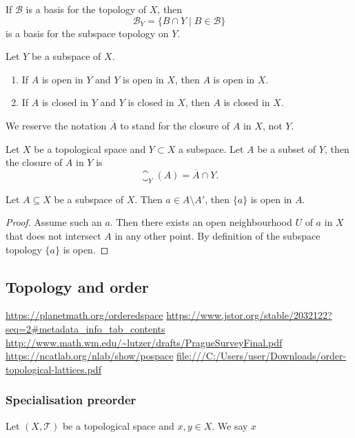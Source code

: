 \begin{lemma}
If $\mathcal{B}$ is a basis for the topology of $X$, then
\[\mathcal{B}_Y = \{ B\cap Y \;|\; B\in \mathcal{B} \}\]
is a basis for the subspace topology on $Y$.
\end{lemma}

\begin{lemma}
Let $Y$ be a subspace of $X$.
\begin{enumerate}
\item If $A$ is open in $Y$ and $Y$ is open in $X$, then $A$ is open in $X$.
\item If $A$ is closed in $Y$ and $Y$ is closed in $X$, then $A$ is closed in $X$.
\end{enumerate}
\end{lemma}
 
We reserve the notation $\overline{A}$ to stand for the closure of $A$ in $X$, not $Y$.
\begin{lemma} \label{subspaceClosure}
Let $X$ be a topological space and $Y\subset X$ a subspace. Let $A$ be a subset of $Y$, then the closure of $A$ in $Y$ is
\[ \closure_Y(A) = \overline{A}\cap Y.  \]
\end{lemma}

\begin{lemma} \label{notLimitPointSingletonOpen}
Let $A\subseteq X$ be a subspace of $X$. Then $a\in A\setminus A'$, then $\{a\}$ is open in $A$.
\end{lemma}
\begin{proof}
Assume such an $a$. Then there exists an open neighbourhood $U$ of $a$ in $X$ that does not intersect $A$ in any other point. By definition of the subspace topology $\{a\}$ is open.
\end{proof}

\subsection{Topology and order}


\url{https://planetmath.org/orderedspace}
\url{https://www.jstor.org/stable/2032122?seq=2#metadata_info_tab_contents}
\url{http://www.math.wm.edu/~lutzer/drafts/PragueSurveyFinal.pdf}
\url{https://ncatlab.org/nlab/show/pospace}
\url{file:///C:/Users/user/Downloads/order-topological-lattices.pdf}

\subsubsection{Specialisation preorder}
\begin{definition}
Let $(X,\mathcal{T})$ be a topological space and $x,y\in X$. We say $x$
\end{definition}

